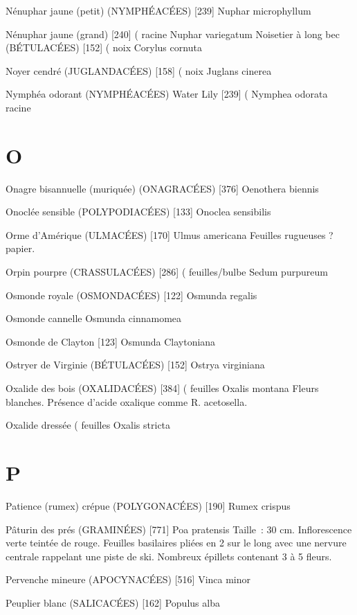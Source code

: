 Nénuphar jaune (petit) (NYMPHÉACÉES)  [239]
				Nuphar microphyllum

Nénuphar jaune (grand)  [240]				( racine
				Nuphar variegatum
Noisetier à long bec (BÉTULACÉES)  [152]		( noix
				Corylus cornuta

Noyer cendré (JUGLANDACÉES)  [158]			( noix
				Juglans cinerea

Nymphéa odorant (NYMPHÉACÉES) Water Lily [239]		(
				Nymphea odorata				racine

\chapter*{O}

Onagre bisannuelle (muriquée) (ONAGRACÉES)  [376]
				Oenothera biennis

Onoclée sensible (POLYPODIACÉES)  [133]
				Onoclea sensibilis

Orme d’Amérique (ULMACÉES)  [170]
				Ulmus americana
Feuilles rugueuses ? papier.

Orpin pourpre (CRASSULACÉES)  [286]		( feuilles/bulbe
				Sedum purpureum

Osmonde royale (OSMONDACÉES) [122]
				Osmunda regalis

Osmonde cannelle
				Osmunda cinnamomea

Osmonde de Clayton  [123]
				Osmunda Claytoniana

Ostryer de Virginie (BÉTULACÉES) [152]
				Ostrya virginiana

Oxalide des bois (OXALIDACÉES)  [384]		( feuilles
				Oxalis montana
Fleurs blanches. Présence d’acide oxalique comme R. acetosella.

Oxalide dressée							( feuilles
				Oxalis stricta

\chapter*{P}

Patience (rumex) crépue (POLYGONACÉES)  [190]
				Rumex crispus

Pâturin des prés (GRAMINÉES)  [771]
				Poa pratensis
Taille : 30 cm. Inflorescence verte teintée de rouge.
Feuilles basilaires pliées en 2 sur le long avec une nervure centrale rappelant une piste de ski.
Nombreux épillets contenant 3 à 5 fleurs.

Pervenche mineure (APOCYNACÉES)  [516]
				Vinca minor

Peuplier blanc (SALICACÉES)  [162]
				Populus alba

